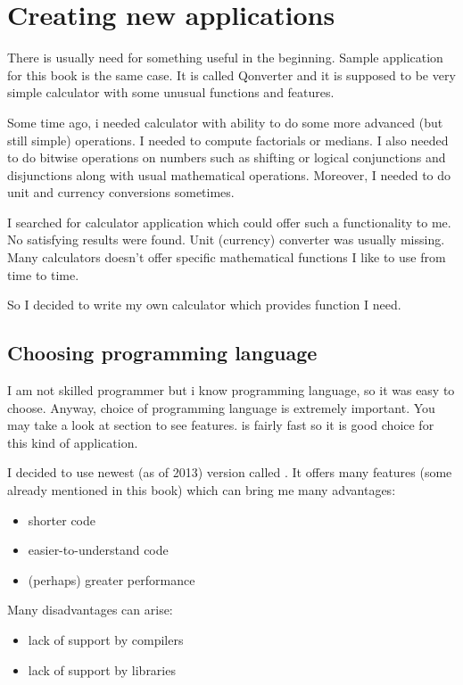 \chapter{Creating new applications}\label{chap:new}
There is usually need for something useful in the beginning. Sample application for this book is the same case. It is called Qonverter and it is supposed to be very simple calculator with some unusual functions and features.

Some time ago, i needed calculator with ability to do some more advanced (but still simple) operations. I needed to compute factorials or medians. I also needed to do bitwise operations on numbers such as shifting or logical conjunctions and disjunctions along with usual mathematical operations. Moreover, I needed to do unit and currency conversions sometimes.

I searched for calculator application which could offer such a functionality to me. No satisfying results were found. Unit (currency) converter was usually missing. Many calculators doesn't offer specific mathematical functions I like to use from time to time.

So I decided to write my own calculator which provides function I need.

\section{Choosing programming language}
I am not skilled programmer but i know \cpp programming language, so it was easy to choose. Anyway, choice of programming language is extremely important. You may take a look at section  to see \cpp features. \cpp is fairly fast so it is good choice for this kind of application.

I decided to use newest (as of 2013) \cpp version called . It offers many features (some already mentioned in this book) which can bring me many advantages:
\begin{itemize}
\item shorter code
\item easier-to-understand code
\item (perhaps) greater performance
\end{itemize}

Many disadvantages can arise:
\begin{itemize}
\item lack of support by \cpp compilers
\item lack of support by libraries
\end{itemize}

